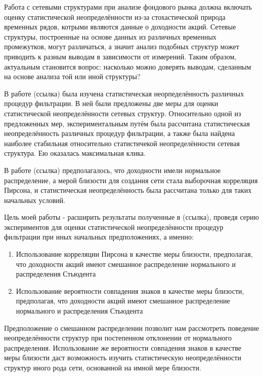 Работа с сетевыми структурами при анализе фондового рынка  должна включать оценку статистической неопределённости из-за стохастической природа временных рядов, котрыми являются данные о доходности акций. Сетевые структуры, построенные на основе данных из различных временных промежутков, могут различаться, а значит анализ подобных структур может приводить к разным выводам в зависимости от измерений. Таким образом, актуальным становится вопрос: насколько можно доверять выводам, сделанным на основе анализа той или иной структуры? 

В работе (ссылка) была изучена статистическая неорпеделённость различных процедур фильтрации. В ней были предложены две меры для оценки статистической неопределённости сетевых структур. Относительно одной из предложенных мер, экспериментальным путём была рассчитана статистическая неопределённость различных процедур фильтрации, а также была найдена наиболее стабильная относительно статистичекой неопределённости сетевая структура. Ею оказалась максимальная клика. 

В работе (ссылка) предполагалось, что доходности имели нормальное распределение, а мерой близости для создания сети стала выборочная корреляция Пирсона, и статистическая неопределённость была рассчитана только для таких начальных условий.

Цель моей работы - расширить результаты полученные в (ссылка), проведя серию экспериментов для оценки статистической неопределённости процедур фильтрации при иных начальных предположениях, а именно:
\begin{enumerate}
	\item Использование корреляции Пирсона в качестве меры близости, предполагая, что доходности акций имеют смешанное распределение нормального и распределения Стьюдента
	\item Использование вероятности совпадения знаков в качестве меры близости, предполагая, что доходности акций имеют смешанное распределение нормального и распределения Стьюдента
\end{enumerate}

Предположение о смешанном распределении позволит нам рассмотреть поведение неопределённости структур при постепенном отклонении от нормального распределения. Использование же вероятности совпадения знаков в качестве меры близости даст возможность изучить статистическую неопределённости структур  иного рода сети, основанной на имной мере близости.

